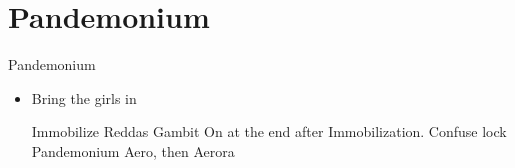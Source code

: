 \chapter{Pandemonium}

\begin{battle}{Pandemonium}
\begin{itemize}
\item Bring the girls in
\begin{gambit}
\begin{itemize}
\end{itemize}
\end{gambit}
\penelof Immobilize Reddas
\ashef Gambit On at the end after Immobilization.
\vaanf Confuse lock Pandemonium
\penelof Aero, then Aerora
\end{itemize}
\end{battle}